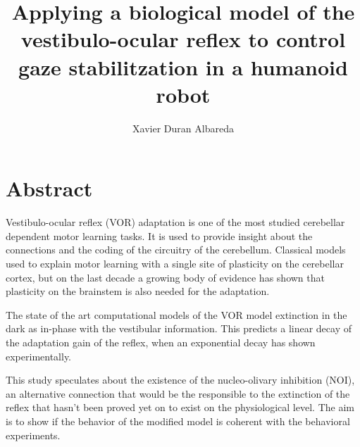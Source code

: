\documentclass[12pt, a4paper,twoside]{tesi_upf}
\title{Applying a biological model of the vestibulo-ocular reflex to control gaze stabilitzation in a humanoid robot}
\author{Xavier Duran Albareda}
\begin{document}
\frontmatter


\cleardoublepage




\vspace*{\fill}
\section*{\Large \sffamily  Abstract}

Vestibulo-ocular reflex (VOR) adaptation is one of the most studied cerebellar dependent motor learning tasks. It is used to provide insight about the connections and the coding of the circuitry of the cerebellum. Classical models used to explain motor learning with a single site of plasticity on the cerebellar cortex, but on the last decade a growing body of evidence has shown that plasticity on the brainstem is also needed for the adaptation.

The state of the art computational models of the VOR model extinction in the dark as in-phase with the vestibular information. This predicts a linear decay of the adaptation gain of the reflex, when an exponential decay has shown experimentally.

This study speculates about the existence of the nucleo-olivary inhibition (NOI), an alternative connection that would be the responsible to the extinction of the reflex that hasn't been proved yet on to exist on the physiological level. The aim is to show if the behavior of the modified model is coherent with the behavioral experiments.

\vspace*{\fill}

\cleardoublepage


\tableofcontents

\listoffigures

\end{document}

